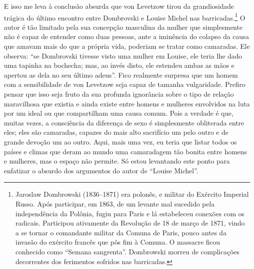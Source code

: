 E isso me leva à conclusão absurda que von Levetzow tirou da
grandiosidade trágica do último encontro entre Dombrovski e
Louise Michel nas barricadas.\footnote{Jaroslaw Dombrowski (1836--1871)
  era polonês, e militar do Exército Imperial Russo. Após participar, em
  1863, de um levante mal sucedido pela independência da Polônia, fugiu
  para Paris e lá estabeleceu conexões com os radicais. Participou
  ativamente da Revolução de 18 de março de 1871, vindo a se tornar o
  comandante militar da Comuna de Paris, pouco antes da invasão do
  exército francês que pôs fim à Comuna. O massacre ficou conhecido como
  ``Semana sangrenta''. Dombrowski morreu de complicações decorrentes
  dos ferimentos sofridos nas barricadas.} O autor é tão limitado pela
sua concepção masculina da mulher que simplesmente não é capaz de
entender como duas pessoas, ante a iminência do colapso da causa que
amavam mais do que a própria vida, poderiam se tratar como camaradas.
Ele observa: ``se Dombrovski tivesse visto uma mulher em Louise, ele
teria lhe dado uma tapinha na bochecha; mas, ao invés disto, ele
estendeu ambas as mãos e apertou as dela no seu último adeus''. Fico
realmente surpresa que um homem com a sensibilidade de von Levetzow seja
capaz de tamanha vulgaridade. Prefiro pensar que isso seja fruto da sua profunda
ignorância sobre o tipo de relação maravilhosa que existia e ainda
existe entre homens e mulheres envolvidos na luta por um ideal ou que
compartilham uma causa comum. Pois a verdade é que, muitas vezes, a
consciência da diferença de sexo é simplesmente obliterada entre eles;
eles são camaradas, capazes do mais alto sacrifício um pelo outro e de
grande devoção um ao outro. Aqui, mais uma vez, eu teria que listar
todos os países e climas que deram ao mundo uma camaradagem tão bonita
entre homens e mulheres, mas o espaço não permite. Só estou levantando
este ponto para enfatizar o absurdo dos argumentos do autor de ``Louise
Michel''.


